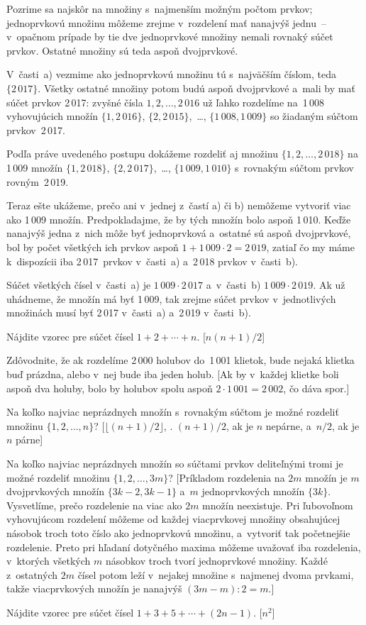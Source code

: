{%
Pozrime sa najskôr na množiny s~najmenším možným počtom prvkov;
jednoprvkovú množinu môžeme zrejme v~rozdelení mať nanajvýš jednu~--
v~opačnom prípade by tie dve jednoprvkové množiny nemali rovnaký súčet
prvkov. Ostatné množiny sú teda aspoň dvojprvkové.

V~časti~a) vezmime ako jednoprvkovú množinu tú s~najväčším číslom, teda
$\{2\,017\}$. Všetky ostatné množiny potom budú aspoň dvojprvkové
a~mali by mať súčet prvkov 2\,017: zvyšné čísla $1, 2, \dots, 2\,016$
už ľahko rozdelíme na~1\,008 vyhovujúcich množín $\{1, 2\,016\}$,
$\{2,2\,015\}$,~\dots, $\{1\,008,1\,009\}$ so žiadaným
súčtom prvkov~2\,017.

Podľa práve uvedeného postupu dokážeme rozdeliť aj množinu
$\{1,2, \dots, 2\,018\}$ na 1\,009 množín $\{1,2\,018\}$, $\{2,2\,017\}$,~\dots,
$\{1\,009,1\,010\}$ s~rovnakým súčtom prvkov rovným~2\,019.

Teraz ešte ukážeme, prečo ani v~jednej z~častí a) či b) nemôžeme
vytvoriť viac ako 1\,009 množín. Predpokladajme, že by tých množín bolo
aspoň 1\,010. Keďže nanajvýš jedna z~nich môže byť jednoprvková
a~ostatné sú aspoň dvojprvkové, bol by počet všetkých ich prvkov
aspoň $1+1\,009 \cdot 2 = 2\,019$, zatiaľ čo my máme k~dispozícii iba 2\,017~prvkov
v~časti~a) a~2\,018 prvkov v~časti~b).

\poznamka
Súčet všetkých čísel v~časti~a) je $1\,009 \cdot 2\,017$ a~v~časti~b)
$1\,009 \cdot 2\,019$. Ak už uhádneme, že množín má byť 1\,009, tak zrejme
súčet prvkov v~jednotlivých množinách musí byť 2\,017 v~časti~a) a~2\,019
v~časti~b).

Nájdite vzorec pre súčet čísel $1+2+\cdots+n$. [$n(n+1) / 2$]

Zdôvodnite, že ak rozdelíme 2\,000 holubov do~1\,001 klietok, bude nejaká
klietka buď prázdna, alebo v~nej bude iba jeden holub.
[Ak by v~každej klietke boli aspoň dva holuby,
bolo by holubov spolu aspoň $2 \cdot 1\,001 = 2\,002$, čo dáva spor.]

\D
Na koľko najviac neprázdnych množín s~rovnakým súčtom je možné rozdeliť
množinu $\{1,2, \dots, n\}$? [$\lfloor (n+1) / 2 \rfloor$, \tj. $(n+1) / 2$, ak
je $n$ nepárne, a~$n / 2$, ak je $n$ párne]

Na koľko najviac neprázdnych množín so súčtami prvkov deliteľnými tromi
je možné rozdeliť množinu $\{1,2, \dots, 3m\}$?
[Príkladom rozdelenia na $2m$ množín je $m$ dvojprvkových množín $\{3k-2,3k-1\}$
a~$m$ jednoprvkových množín $\{3k\}$.
Vysvetlíme, prečo rozdelenie na viac ako $2m$ množín neexistuje.
Pri ľubovoľnom vyhovujúcom rozdelení môžeme od každej viacprvkovej množiny
obsahujúcej násobok troch toto číslo  ako jednoprvkovú množinu,
a~vytvoriť tak početnejšie rozdelenie. Preto pri hľadaní dotyčného maxima môžeme
uvažovať iba rozdelenia, v~ktorých všetkých $m$ násobkov troch tvorí jednoprvkové množiny.
Každé z~ostatných $2m$ čísel potom leží v~nejakej množine s~najmenej dvoma prvkami,
takže viacprvkových množín je nanajvýš $(3m-m):2=m$.]

Nájdite vzorec pre súčet čísel $1+3+5+\cdots+(2n-1)$. [$n^2$]
}


